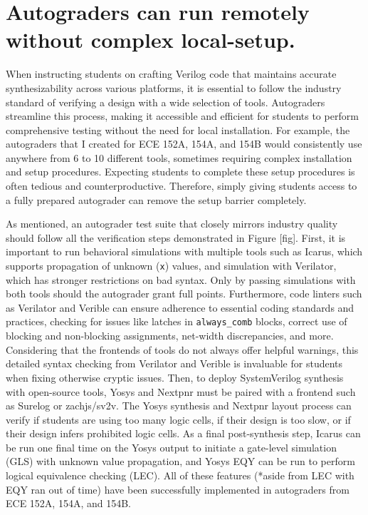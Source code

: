 \section{Autograders can run remotely without complex local-setup.}
\label{section:complex_tool_setups}

When instructing students on crafting Verilog code that maintains accurate synthesizability across various platforms, it is essential to follow the industry standard of verifying a design with a wide selection of tools. Autograders streamline this process, making it accessible and efficient for students to perform comprehensive testing without the need for local installation. For example, the autograders that I created for ECE 152A, 154A, and 154B would consistently use anywhere from 6 to 10 different tools, sometimes requiring complex installation and setup procedures. Expecting students to complete these setup procedures is often tedious and counterproductive. Therefore, simply giving students access to a fully prepared autograder can remove the setup barrier completely.

As mentioned, an autograder test suite that closely mirrors industry quality should follow all the verification steps demonstrated in Figure [fig]. First, it is important to run behavioral simulations with multiple tools such as Icarus, which supports propagation of unknown (\texttt{x}) values, and simulation with Verilator, which has stronger restrictions on bad syntax. Only by passing simulations with both tools should the autograder grant full points. Furthermore, code linters such as Verilator and Verible can ensure adherence to essential coding standards and practices, checking for issues like latches in \texttt{always_comb} blocks, correct use of blocking and non-blocking assignments, net-width discrepancies, and more. Considering that the frontends of tools do not always offer helpful warnings, this detailed syntax checking from Verilator and Verible is invaluable for students when fixing otherwise cryptic issues. Then, to deploy SystemVerilog synthesis with open-source tools, Yosys and Nextpnr must be paired with a frontend such as Surelog or zachjs/sv2v. The Yosys synthesis and Nextpnr layout process can verify if students are using too many logic cells, if their design is too slow, or if their design infers prohibited logic cells. As a final post-synthesis step, Icarus can be run one final time on the Yosys output to initiate a gate-level simulation (GLS) with unknown value propagation, and Yosys EQY can be run to perform logical equivalence checking (LEC). All of these features (*aside from LEC with EQY {ran out of time}) have been successfully implemented in autograders from ECE 152A, 154A, and 154B.

